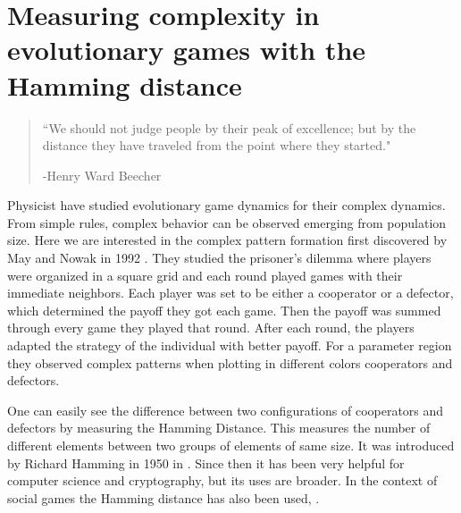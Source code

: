 \chapter{Measuring complexity in evolutionary games with the Hamming distance}
\label{chap:HammingGames}




\begin{quotation}

    \begin{flushright}
    \begin{minipage}[t][5cm][b]{0.5\textwidth}
    { ``We should not judge people by their peak of excellence; but by the distance they have traveled from the point where they started."}
    
    \bigskip
    
    -{\small  Henry Ward Beecher}
    \end{minipage}
    \end{flushright}
    
    \vspace{0.5cm}
\end{quotation}




Physicist have studied evolutionary game dynamics for their complex dynamics. From simple rules, complex behavior can be observed emerging from population size. Here we are interested in the complex pattern formation first discovered by May and Nowak in 1992 \cite{SpatialChaos}. They studied the prisoner's dilemma where players were organized in a square grid and each round played games with their immediate neighbors. Each player was set to be either a cooperator or a defector, which determined the payoff they got each game. Then the payoff was summed through every game they played that round. After each round, the players adapted the strategy of the individual with better payoff. For a parameter region they observed complex patterns when plotting in different colors cooperators and defectors.

One can easily see the difference between two configurations of cooperators and defectors by measuring the Hamming Distance. This measures the number of different elements between two groups of elements of same size. It was introduced
by Richard Hamming in 1950 in \cite{HammingOrigins}. Since then it has been very helpful for computer science and cryptography, but its uses are broader. In the context of social games the Hamming distance has also been used, \cite{HammingSocial1, HammingSocial2}.

